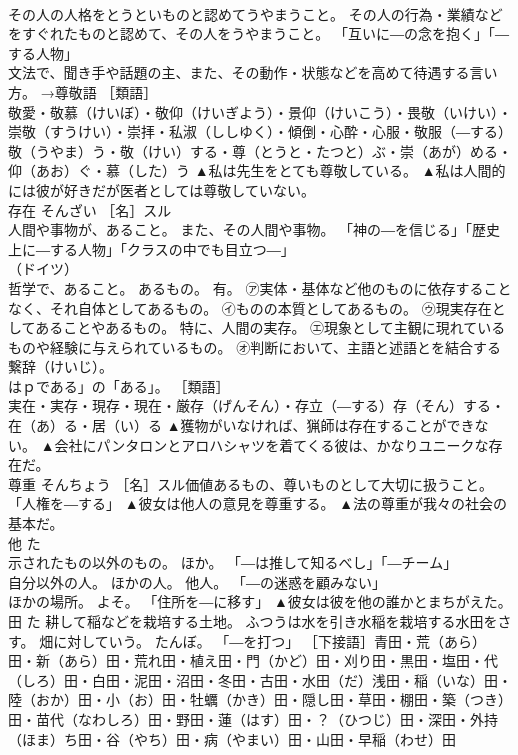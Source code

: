 \documentclass[8pt]{extreport}
\begin{document}
\begin{CJK}{UTF8}{min}
\\	その人の人格をとうといものと認めてうやまうこと。 その人の行為・業績などをすぐれたものと認めて、その人をうやまうこと。 「互いに―の念を抱く」「―する人物」 
\\	文法で、聞き手や話題の主、また、その動作・状態などを高めて待遇する言い方。 →尊敬語 ［類語］
\\	敬愛・敬慕（けいぼ）・敬仰（けいぎよう）・景仰（けいこう）・畏敬（いけい）・崇敬（すうけい）・崇拝・私淑（ししゆく）・傾倒・心酔・心服・敬服（―する）敬（うやま）う・敬（けい）する・尊（とうと・たつと）ぶ・崇（あが）める・仰（あお）ぐ・慕（した）う	▲私は先生をとても尊敬している。 ▲私は人間的には彼が好きだが医者としては尊敬していない。
\\	存在	そんざい	［名］スル 
\\	人間や事物が、あること。 また、その人間や事物。 「神の―を信じる」「歴史上に―する人物」「クラスの中でも目立つ―」 
\\	（ドイツ）
\\	哲学で、あること。 あるもの。 有。 ㋐実体・基体など他のものに依存することなく、それ自体としてあるもの。 ㋑ものの本質としてあるもの。 ㋒現実存在としてあることやあるもの。 特に、人間の実存。 ㋓現象として主観に現れているものや経験に与えられているもの。 ㋔判断において、主語と述語とを結合する繋辞（けいじ）。 
\\	はｐである」の「ある」。 ［類語］
\\	実在・実存・現存・現在・厳存（げんそん）・存立（―する）存（そん）する・在（あ）る・居（い）る	▲獲物がいなければ、猟師は存在することができない。 ▲会社にパンタロンとアロハシャツを着てくる彼は、かなりユニークな存在だ。
\\	尊重	そんちょう	［名］スル価値あるもの、尊いものとして大切に扱うこと。 「人権を―する」	▲彼女は他人の意見を尊重する。 ▲法の尊重が我々の社会の基本だ。
\\	他	た	
\\	示されたもの以外のもの。 ほか。 「―は推して知るべし」「―チーム」 
\\	自分以外の人。 ほかの人。 他人。 「―の迷惑を顧みない」 
\\	ほかの場所。 よそ。 「住所を―に移す」	▲彼女は彼を他の誰かとまちがえた。
\\	田	た	耕して稲などを栽培する土地。 ふつうは水を引き水稲を栽培する水田をさす。 畑に対していう。 たんぼ。 「―を打つ」 ［下接語］青田・荒（あら）田・新（あら）田・荒れ田・植え田・門（かど）田・刈り田・黒田・塩田・代（しろ）田・白田・泥田・沼田・冬田・古田・水田（だ）浅田・稲（いな）田・陸（おか）田・小（お）田・牡蠣（かき）田・隠し田・草田・棚田・築（つき）田・苗代（なわしろ）田・野田・蓮（はす）田・？（ひつじ）田・深田・外持（ほま）ち田・谷（やち）田・病（やまい）田・山田・早稲（わせ）田	

\end{CJK}
\end{document}
